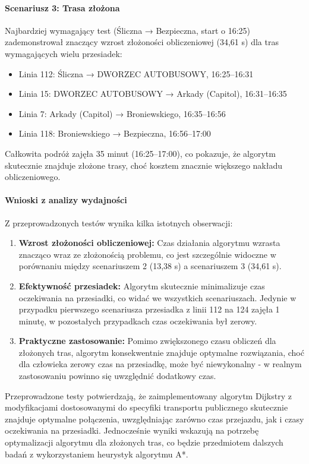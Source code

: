 \documentclass[12pt,a4paper]{article}
\begin{document}
\paragraph{Scenariusz 3: Trasa złożona}
Najbardziej wymagający test (Śliczna → Bezpieczna, start o 16:25) zademonstrował znaczący wzrost złożoności obliczeniowej (34,61 s) dla tras wymagających wielu przesiadek:
\begin{itemize}
    \item Linia 112: Śliczna → DWORZEC AUTOBUSOWY, 16:25--16:31
    \item Linia 15: DWORZEC AUTOBUSOWY → Arkady (Capitol), 16:31--16:35
    \item Linia 7: Arkady (Capitol) → Broniewskiego, 16:35--16:56
    \item Linia 118: Broniewskiego → Bezpieczna, 16:56--17:00
\end{itemize}
Całkowita podróż zajęła 35 minut (16:25--17:00), co pokazuje, że algorytm skutecznie znajduje złożone trasy, choć kosztem znacznie większego nakładu obliczeniowego.

\paragraph{Wnioski z analizy wydajności}
Z przeprowadzonych testów wynika kilka istotnych obserwacji:
\begin{enumerate}
    \item \textbf{Wzrost złożoności obliczeniowej:} Czas działania algorytmu wzrasta znacząco wraz ze złożonością problemu, co jest szczególnie widoczne w porównaniu między scenariuszem 2 (13,38 s) a scenariuszem 3 (34,61 s).
    \item \textbf{Efektywność przesiadek:} Algorytm skutecznie minimalizuje czas oczekiwania na przesiadki, co widać we wszystkich scenariuszach. Jedynie w przypadku pierwszego scenariusza przesiadka z linii 112 na 124 zajęła 1 minutę, w pozostałych przypadkach czas oczekiwania był zerowy.
    \item \textbf{Praktyczne zastosowanie:} Pomimo zwiększonego czasu obliczeń dla złożonych tras, algorytm konsekwentnie znajduje optymalne rozwiązania, choć dla człowieka zerowy czas na przesiadkę, może być niewykonalny - w realnym zastosowaniu powinno się uwzględnić dodatkowy czas.
\end{enumerate}

Przeprowadzone testy potwierdzają, że zaimplementowany algorytm Dijkstry z modyfikacjami dostosowanymi do specyfiki transportu publicznego skutecznie znajduje optymalne połączenia, uwzględniając zarówno czas przejazdu, jak i czasy oczekiwania na przesiadki. Jednocześnie wyniki wskazują na potrzebę optymalizacji algorytmu dla złożonych tras, co będzie przedmiotem dalszych badań z wykorzystaniem heurystyk algorytmu A*.
\end{document}
